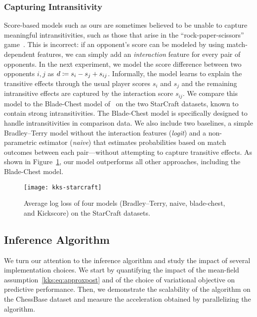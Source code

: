 \subsubsection{Capturing Intransitivity} \label{kks:sec:eval-intrans}
Score-based models such as ours are sometimes believed to be unable to capture meaningful intransitivities, such as those that arise in the ``rock-paper-scissors'' game~\citep{chen2016modeling}.
This is incorrect: if an opponent's score can be modeled by using match-dependent features, we can simply add an \emph{interaction} feature for every pair of opponents.
In the next experiment, we model the score difference between two opponents $i, j$ as $d \coloneqq s_i - s_j + s_{ij}$.
Informally, the model learns to explain the transitive effects through the usual player scores $s_i$ and $s_j$ and the remaining intransitive effects are captured by the interaction score $s_{ij}$.
We compare this model to the Blade-Chest model of~\citet{chen2016modeling} on the two StarCraft datasets, known to contain strong intransitivities.
The Blade-Chest model is specifically designed to handle intransitivities in comparison data.
We also include two baselines, a simple Bradley--Terry model without the interaction features (\emph{logit}) and a non-parametric estimator (\emph{naive}) that estimates probabilities based on match outcomes between each pair---without attempting to capture transitive effects.
As shown in Figure~\ref{kks:fig:starcraft}, our model outperforms all other approaches, including the Blade-Chest model.

\begin{figure}
	\centering
	\texttt{[image: kks-starcraft]}
	\caption{
		Average log loss of four models (Bradley--Terry, naive, blade-chest, and Kickscore) on the StarCraft datasets.}
	\label{kks:fig:starcraft}
\end{figure}


\subsection{Inference Algorithm}
\label{kks:sec:evalinf}
We turn our attention to the inference algorithm and study the impact of several implementation choices.
We start by quantifying the impact of the mean-field assumption~\eqref{kks:eq:approxpost} and of the choice of variational objective on predictive performance.
Then, we demonstrate the scalability of the algorithm on the ChessBase dataset and measure the acceleration obtained by parallelizing the algorithm.


